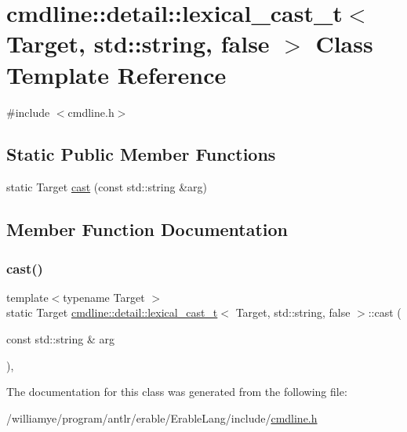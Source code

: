 \hypertarget{classcmdline_1_1detail_1_1lexical__cast__t_3_01_target_00_01std_1_1string_00_01false_01_4}{}\section{cmdline\+::detail\+::lexical\+\_\+cast\+\_\+t$<$ Target, std\+::string, false $>$ Class Template Reference}
\label{classcmdline_1_1detail_1_1lexical__cast__t_3_01_target_00_01std_1_1string_00_01false_01_4}


{\ttfamily \#include $<$cmdline.\+h$>$}

\subsection*{Static Public Member Functions}
\begin{DoxyCompactItemize}
\item 
static Target \mbox{\hyperlink{classcmdline_1_1detail_1_1lexical__cast__t_3_01_target_00_01std_1_1string_00_01false_01_4_a8612edb07ba3ba15be8615dcacbf58e3}{cast}} (const std\+::string \&arg)
\end{DoxyCompactItemize}


\subsection{Member Function Documentation}
\mbox{\label{classcmdline_1_1detail_1_1lexical__cast__t_3_01_target_00_01std_1_1string_00_01false_01_4_a8612edb07ba3ba15be8615dcacbf58e3}} 
\subsubsection{\texorpdfstring{cast()}{cast()}}
{\footnotesize\ttfamily template$<$typename Target $>$ \\
static Target \mbox{\hyperlink{classcmdline_1_1detail_1_1lexical__cast__t}{cmdline\+::detail\+::lexical\+\_\+cast\+\_\+t}}$<$ Target, std\+::string, false $>$\+::cast (\begin{DoxyParamCaption}\item[{const std\+::string \&}]{arg }\end{DoxyParamCaption})\hspace{0.3cm}{\ttfamily [inline]}, {\ttfamily [static]}}



The documentation for this class was generated from the following file\+:\begin{DoxyCompactItemize}
\item 
/williamye/program/antlr/erable/\+Erable\+Lang/include/\mbox{\hyperlink{cmdline_8h}{cmdline.\+h}}\end{DoxyCompactItemize}
